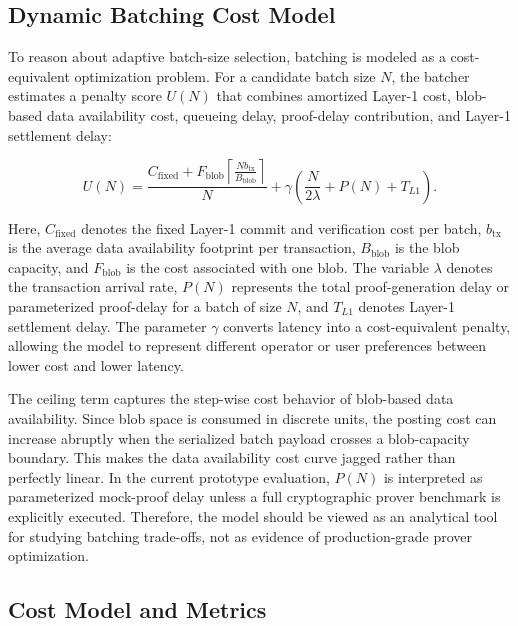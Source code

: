 \begin{itemize}[leftmargin=1.5em]
\subsection{Dynamic Batching Cost Model}
\label{subsec:dynamic_batching_model}

To reason about adaptive batch-size selection, batching is modeled as a cost-equivalent optimization problem. For a candidate batch size \(N\), the batcher estimates a penalty score \(U(N)\) that combines amortized Layer-1 cost, blob-based data availability cost, queueing delay, proof-delay contribution, and Layer-1 settlement delay:

\begin{equation}
U(N)=
\frac{
C_{\mathrm{fixed}}
+
F_{\mathrm{blob}}
\left\lceil
\frac{N b_{\mathrm{tx}}}{B_{\mathrm{blob}}}
\right\rceil
}{N}
+
\gamma
\left(
\frac{N}{2\lambda}
+
P(N)
+
T_{L1}
\right).
\label{eq:dynamic_batching}
\end{equation}

Here, \(C_{\mathrm{fixed}}\) denotes the fixed Layer-1 commit and verification cost per batch, \(b_{\mathrm{tx}}\) is the average data availability footprint per transaction, \(B_{\mathrm{blob}}\) is the blob capacity, and \(F_{\mathrm{blob}}\) is the cost associated with one blob. The variable \(\lambda\) denotes the transaction arrival rate, \(P(N)\) represents the total proof-generation delay or parameterized proof-delay for a batch of size \(N\), and \(T_{L1}\) denotes Layer-1 settlement delay. The parameter \(\gamma\) converts latency into a cost-equivalent penalty, allowing the model to represent different operator or user preferences between lower cost and lower latency.

The ceiling term captures the step-wise cost behavior of blob-based data availability. Since blob space is consumed in discrete units, the posting cost can increase abruptly when the serialized batch payload crosses a blob-capacity boundary. This makes the data availability cost curve jagged rather than perfectly linear. In the current prototype evaluation, \(P(N)\) is interpreted as parameterized mock-proof delay unless a full cryptographic prover benchmark is explicitly executed. Therefore, the model should be viewed as an analytical tool for studying batching trade-offs, not as evidence of production-grade prover optimization.

\subsection{Cost Model and Metrics}


\end{itemize}
